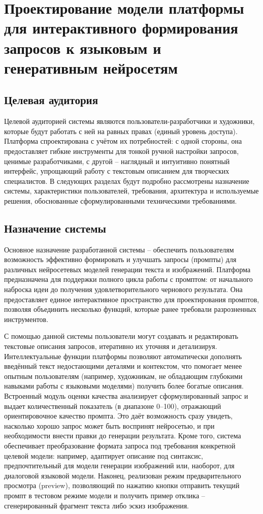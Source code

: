 \section{Проектирование модели платформы для интерактивного формирования
запросов к языковым и генеративным нейросетям}
\label{sec:designing}
\subsection{Целевая аудитория}
Целевой аудиторией системы являются пользователи-разработчики и художники, которые будут работать с ней на равных правах (единый уровень доступа). Платформа спроектирована с учётом их потребностей: с одной стороны, она предоставляет гибкие инструменты для тонкой ручной настройки запросов, ценимые разработчиками, с другой – наглядный и интуитивно понятный интерфейс, упрощающий работу с текстовым описанием для творческих специалистов. В следующих разделах будут подробно рассмотрены назначение системы, характеристики пользователей, требования, архитектура и используемые решения, обоснованные сформулированными техническими требованиями.

\subsection{Назначение системы}
Основное назначение разработанной системы – обеспечить пользователям возможность эффективно формировать и улучшать запросы (промпты) для различных нейросетевых моделей генерации текста и изображений.
Платформа предназначена для поддержки полного цикла работы с промптом: от начального наброска идеи до получения удовлетворительного чернового результата. Она предоставляет единое интерактивное пространство для проектирования промптов, позволяя объединить несколько функций, которые ранее требовали разрозненных инструментов.

С помощью данной системы пользователи могут создавать и редактировать текстовые описания запросов, итеративно их уточняя и детализируя. Интеллектуальные функции платформы позволяют автоматически дополнять введённый текст недостающими деталями и контекстом, что помогает менее опытным пользователям (например, художникам, не обладающим глубокими навыками работы с языковыми моделями) получить более богатые описания. Встроенный модуль оценки качества анализирует сформулированный запрос и выдает количественный показатель (в диапазоне 0–100), отражающий ориентировочное качество промпта. Это даёт возможность сразу увидеть, насколько хорошо запрос может быть воспринят нейросетью, и при необходимости внести правки до генерации результата. Кроме того, система обеспечивает преобразование формата запроса под требования конкретной целевой модели: например, адаптирует описание под синтаксис, предпочтительный для модели генерации изображений или, наоборот, для диалоговой языковой модели. Наконец, реализован режим предварительного просмотра (preview), позволяющий по нажатию кнопки отправить текущий промпт в тестовом режиме модели и получить пример отклика – сгенерированный фрагмент текста либо эскиз изображения.

